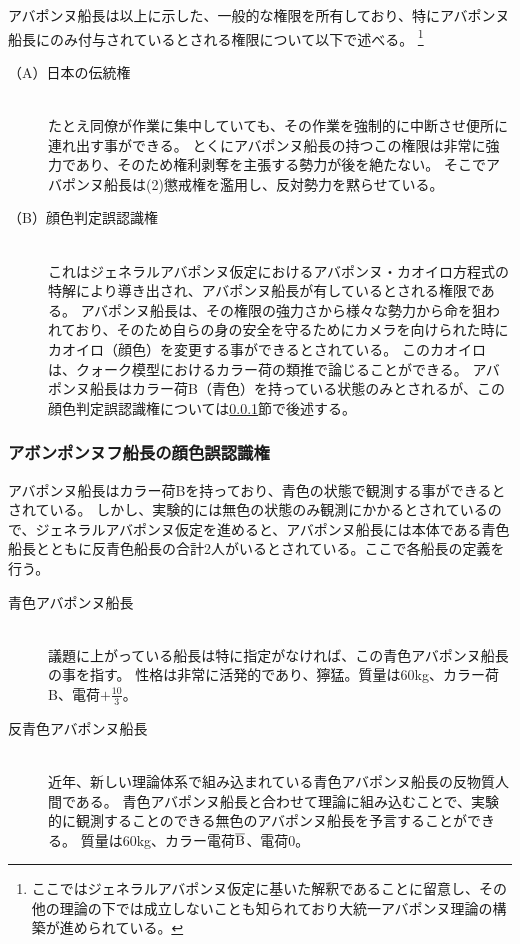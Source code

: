 アバポンヌ船長は以上に示した、一般的な権限を所有しており、特にアバポンヌ船長にのみ付与されているとされる権限について以下で述べる。
\footnote{ここではジェネラルアバポンヌ仮定に基いた解釈であることに留意し、その他の理論の下では成立しないことも知られており大統一アバポンヌ理論の構築が進められている。}

\begin{description}
\item[（A）日本の伝統権]\mbox{}\\
たとえ同僚が作業に集中していても、その作業を強制的に中断させ便所に連れ出す事ができる。
とくにアバポンヌ船長の持つこの権限は非常に強力であり、そのため権利剥奪を主張する勢力が後を絶たない。
そこでアバポンヌ船長は(2)懲戒権を濫用し、反対勢力を黙らせている。

\item[（B）顔色判定誤認識権]\mbox{}\\
これはジェネラルアバポンヌ仮定におけるアバポンヌ・カオイロ方程式の特解により導き出され、アバポンヌ船長が有しているとされる権限である。
アバポンヌ船長は、その権限の強力さから様々な勢力から命を狙われており、そのため自らの身の安全を守るためにカメラを向けられた時にカオイロ（顔色）を変更する事ができるとされている。
このカオイロは、クォーク模型におけるカラー荷の類推で論じることができる。
アバポンヌ船長はカラー荷B（青色）を持っている状態のみとされるが、この顔色判定誤認識権については\ref{KAO}節で後述する。
\end{description}

\subsubsection{アボンポンヌフ船長の顔色誤認識権}\label{KAO}
アバポンヌ船長はカラー荷Bを持っており、青色の状態で観測する事ができるとされている。
しかし、実験的には無色の状態のみ観測にかかるとされているので、ジェネラルアバポンヌ仮定を進めると、アバポンヌ船長には本体である青色船長とともに反青色船長の合計2人がいるとされている。ここで各船長の定義を行う。

\begin{description}
\item[青色アバポンヌ船長]\mbox{}\\
議題に上がっている船長は特に指定がなければ、この青色アバポンヌ船長の事を指す。
性格は非常に活発的であり、獰猛。質量は60kg、カラー荷B、電荷$+\frac{10}{3}$。

\item[反青色アバポンヌ船長]\mbox{}\\
近年、新しい理論体系で組み込まれている青色アバポンヌ船長の反物質人間である。
青色アバポンヌ船長と合わせて理論に組み込むことで、実験的に観測することのできる無色のアバポンヌ船長を予言することができる。
質量は60kg、カラー電荷$\overline{\rm{B}}$、電荷0。
\end{description}

